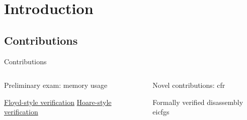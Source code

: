 \section{Introduction}

\subsection{Contributions}

\begin{frame}{Contributions}
  \begin{columns}
    \begin{block}{Preliminary exam: memory usage}
      \begin{outline}
        \1 \hyperlink{floyd}{Floyd-style verification}
        \1 \hyperlink{hoare}{Hoare-style verification}
      \end{outline}
    \end{block}

    \begin{block}{Novel contributions: \gls{cfr}}
      \begin{outline}
        \1 \alert{Formally verified disassembly}
        \1 \Glspl{eicfg}
      \end{outline}
    \end{block}
  \end{columns}
\end{frame}


